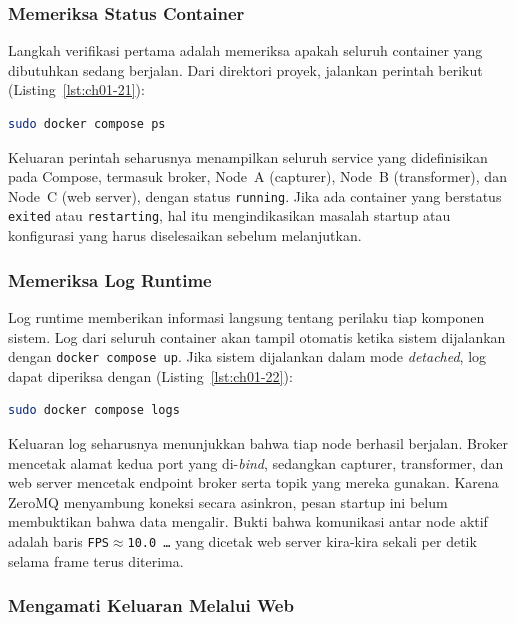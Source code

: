 \subsubsection{Memeriksa Status Container}

Langkah verifikasi pertama adalah memeriksa apakah seluruh container yang
dibutuhkan sedang berjalan. Dari direktori proyek, jalankan perintah berikut (Listing~\ref{lst:ch01-21}):

\begin{lstlisting}[language=bash, caption={Memeriksa container yang berjalan}, label={lst:ch01-21}]
sudo docker compose ps
\end{lstlisting}

Keluaran perintah seharusnya menampilkan seluruh service yang didefinisikan pada
Compose, termasuk broker, Node~A (capturer), Node~B (transformer), dan Node~C (web
server), dengan status \texttt{running}. Jika ada container yang berstatus
\texttt{exited} atau \texttt{restarting}, hal itu mengindikasikan masalah startup
atau konfigurasi yang harus diselesaikan sebelum melanjutkan.

\subsubsection{Memeriksa Log Runtime}

Log runtime memberikan informasi langsung tentang perilaku tiap komponen sistem.
Log dari seluruh container akan tampil otomatis ketika sistem dijalankan dengan
\texttt{docker compose up}. Jika sistem dijalankan dalam mode \emph{detached},
log dapat diperiksa dengan (Listing~\ref{lst:ch01-22}):

\begin{lstlisting}[language=bash, caption={Memeriksa container yang berjalan (2)}, label={lst:ch01-22}]
sudo docker compose logs
\end{lstlisting}

Keluaran log seharusnya menunjukkan bahwa tiap node berhasil berjalan. Broker
mencetak alamat kedua port yang di-\emph{bind}, sedangkan capturer, transformer,
dan web server mencetak endpoint broker serta topik yang mereka gunakan. Karena
ZeroMQ menyambung koneksi secara asinkron, pesan startup ini belum membuktikan
bahwa data mengalir. Bukti bahwa komunikasi antar node aktif adalah baris
\texttt{FPS$\approx$10.0 \ldots} yang dicetak web server kira-kira sekali per
detik selama frame terus diterima.

\subsubsection{Mengamati Keluaran Melalui Web}

